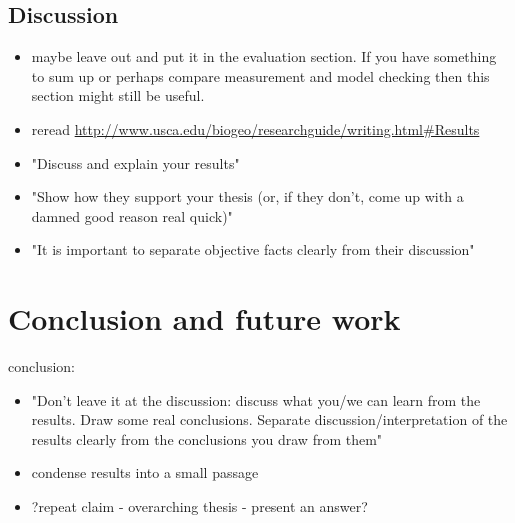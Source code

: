 \documentclass[a4paper, 10pt]{article}
\begin{document}
\subsection{Discussion}
\label{ssec:analysis-discussion}
\begin{itemize}
	\item maybe leave out and put it in the evaluation section. If you have something to sum up or perhaps compare measurement and model checking then this section might still be useful.
	\item reread \url{http://www.usca.edu/biogeo/researchguide/writing.html#Results}
	\item "Discuss and explain your results"
	\item "Show how they support your thesis (or, if they don't, come up with a damned good reason real quick)"
	\item "It is important to separate objective facts clearly from their discussion"
\end{itemize}

\section{Conclusion and future work}
\label{sec:conclusion}
conclusion:
\begin{itemize}
	\item "Don't leave it at the discussion: discuss what you/we can learn from the results. Draw some real conclusions. Separate discussion/interpretation of the results clearly from the conclusions you draw from them"
	\item condense results into a small passage
	\item ?repeat claim - overarching thesis - present an answer?
\end{itemize}
\end{document}
